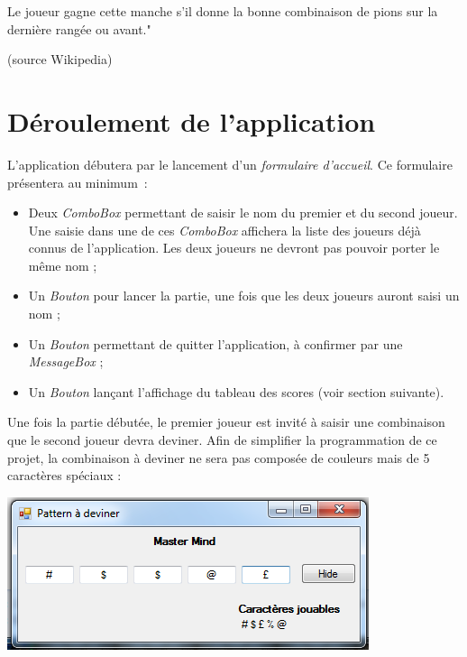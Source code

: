 \documentclass[10pt,a4paper,oneside]{article}
\begin{document}
\medskip

Le joueur gagne cette manche s'il donne la bonne combinaison de pions sur la dernière rangée ou avant."

\begin{flushright}
    (source Wikipedia)
\end{flushright}

\section{Déroulement de l'application}

L'application débutera par le lancement d'un {\em formulaire d'accueil}. Ce formulaire présentera au minimum~:

\medskip

\begin{itemize}
  \item Deux {\em ComboBox} permettant de saisir le nom du premier et du second joueur. Une saisie dans une de ces {\em ComboBox} affichera la liste des joueurs déjà connus de l'application. Les deux joueurs ne devront pas pouvoir porter le même nom ;
  \item Un {\em Bouton} pour lancer la partie, une fois que les deux joueurs auront saisi un nom ;
  \item Un {\em Bouton} permettant de quitter l'application, à confirmer par une {\em MessageBox} ;
  \item Un {\em Bouton} lançant l'affichage du tableau des scores (voir section suivante).
\end{itemize}

\bigskip

Une fois la partie débutée, le premier joueur est invité à saisir une combinaison que le second joueur devra deviner. Afin de simplifier la programmation de ce projet, la combinaison à deviner ne sera pas composée de couleurs mais de 5 caractères spéciaux :

\begin{center}
    \includegraphics[scale=0.6]{pictures/player1.png}
\end{center}
\end{document}
